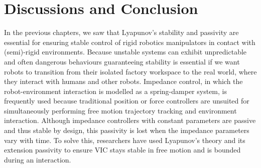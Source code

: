 \chapter{Discussions and Conclusion}
\label{chapter:conclusion}

In the previous chapters, we saw that Lyapunov's stability and passivity are essential for ensuring stable control of rigid robotics manipulators in contact with (semi)-rigid environments. Because unstable systems can exhibit unpredictable and often dangerous behaviours guaranteeing stability is essential if we want robots to transition from their isolated factory workspace to the real world, where they interact with humans and other robots. Impedance control, in which the robot-environment interaction is modelled as a spring-damper system, is frequently used because traditional position or force controllers are unsuited for simultaneously performing free motion trajectory tracking and environment interaction. Although impedance controllers with constant parameters are passive and thus stable by design, this passivity is lost when the impedance parameters vary with time. To solve this, researchers have used Lyapunov's theory and its extension passivity to ensure VIC stays stable in free motion and is bounded during an interaction.

